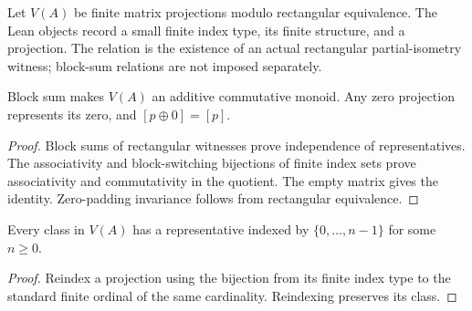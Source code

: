 \begin{definition}\label{def:stable-projection-monoid}
\leanok
Let $V(A)$ be finite matrix projections modulo rectangular equivalence.
The Lean objects record a small finite index type, its finite structure,
and a projection. The relation is the existence of an actual rectangular
partial-isometry witness; block-sum relations are not imposed separately.
\end{definition}

\begin{proposition}\label{prop:stable-projection-monoid-laws}
Block sum makes $V(A)$ an additive commutative monoid. Any zero projection
represents its zero, and $[p\oplus0]=[p]$.
\end{proposition}
\begin{proof}
\leanok
Block sums of rectangular witnesses prove independence of representatives.
The associativity and block-switching bijections of finite index sets prove
associativity and commutativity in the quotient. The empty matrix gives the
identity. Zero-padding invariance follows from rectangular equivalence.
\end{proof}

\begin{proposition}\label{prop:stable-projection-finite-representative}
Every class in $V(A)$ has a representative indexed by
$\{0,\ldots,n-1\}$ for some $n\geq0$.
\end{proposition}
\begin{proof}
\leanok
Reindex a projection using the bijection from its finite index type to the
standard finite ordinal of the same cardinality. Reindexing preserves its class.
\end{proof}

